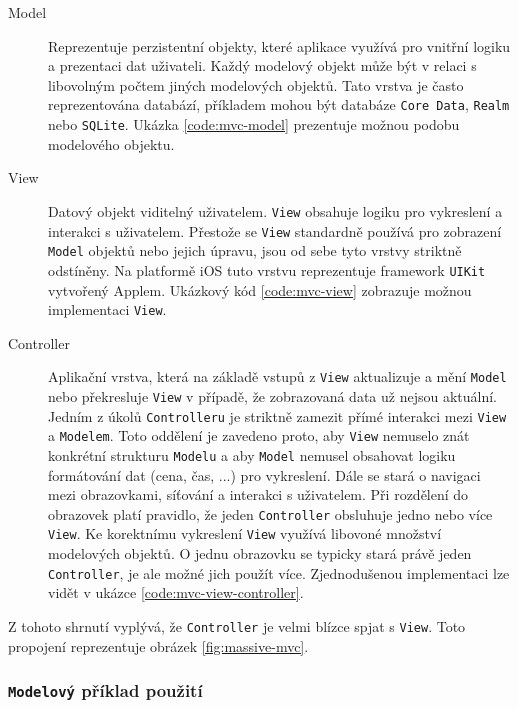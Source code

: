 \begin{description}
  \item[Model] Reprezentuje perzistentní objekty, které aplikace využívá pro vnitřní logiku a prezentaci dat uživateli.
  Každý modelový objekt může být v relaci s libovolným počtem jiných modelových objektů.
  Tato vrstva je často reprezentována databází, příkladem mohou být databáze \texttt{Core Data}, \texttt{Realm} nebo \texttt{SQLite}.
  Ukázka \ref{code:mvc-model} prezentuje možnou podobu modelového objektu.

  \item[View] Datový objekt viditelný uživatelem. \texttt{View} obsahuje logiku pro vykreslení a interakci s uživatelem.
  Přestože se \texttt{View} standardně používá pro zobrazení \texttt{Model} objektů nebo jejich úpravu, jsou od sebe tyto vrstvy striktně odstíněny.
  Na platformě iOS tuto vrstvu reprezentuje framework \texttt{UIKit} vytvořený Applem.
  Ukázkový kód \ref{code:mvc-view} zobrazuje možnou implementaci \texttt{View}.

  \item[Controller] Aplikační vrstva, která na základě vstupů z \texttt{View} aktualizuje a mění \texttt{Model} nebo překresluje \texttt{View} v případě, že zobrazovaná data už nejsou aktuální.
  Jedním z úkolů \texttt{Controlleru} je striktně zamezit přímé interakci mezi \texttt{View} a \texttt{Modelem}.
  Toto oddělení je zavedeno proto, aby \texttt{View} nemuselo znát konkrétní strukturu \texttt{Modelu} a aby \texttt{Model} nemusel obsahovat logiku formátování dat (cena, čas, ...) pro vykreslení.
  Dále se stará o navigaci mezi obrazovkami, síťování a interakci s uživatelem.
  Při rozdělení do obrazovek platí pravidlo, že jeden \texttt{Controller} obsluhuje jedno nebo více \texttt{View}.
  Ke korektnímu vykreslení \texttt{View} využívá libovoné množství modelových objektů.
  O jednu obrazovku se typicky stará právě jeden \texttt{Controller}, je ale možné jich použít více.
  Zjednodušenou implementaci lze vidět v ukázce \ref{code:mvc-view-controller}.
\end{description}

Z tohoto shrnutí vyplývá, že \texttt{Controller} je velmi blízce spjat s \texttt{View}. Toto propojení reprezentuje obrázek \ref{fig:massive-mvc}.

\subsubsection*{\texttt{Modelový} příklad použití}

